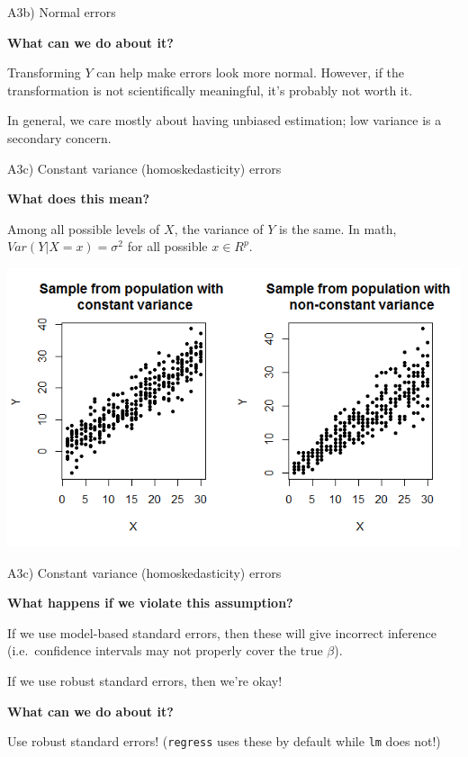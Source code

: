 \documentclass[12pt,ignorenonframetext,]{beamer}
\begin{document}
\begin{frame}{A3b) Normal errors}

\textbf{What can we do about it?}

Transforming \(Y\) can help make errors look more normal. However, if
the transformation is not scientifically meaningful, it's probably not
worth it.

In general, we care mostly about having unbiased estimation; low
variance is a secondary concern.

\end{frame}

\begin{frame}{A3c) Constant variance (homoskedasticity) errors}

\textbf{What does this mean?}

Among all possible levels of \(X\), the variance of \(Y\) is the same.
In math, \(Var(Y|X=x) = \sigma^2\) for all possible \(x \in R^p\).

\pause

\centering
\includegraphics{hetero.png}

\end{frame}

\begin{frame}{A3c) Constant variance (homoskedasticity) errors}

\textbf{What happens if we violate this assumption?}

If we use model-based standard errors, then these will give incorrect
inference (i.e.~confidence intervals may not properly cover the true
\(\beta\)).

If we use robust standard errors, then we're okay!

\textbf{What can we do about it?}

Use robust standard errors! (\texttt{regress} uses these by default
while \texttt{lm} does not!)

\end{frame}
\end{document}
